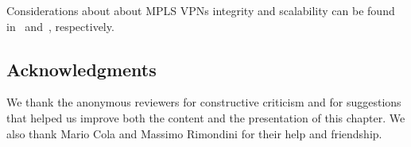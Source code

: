 \documentclass{article}
\begin{document}
Considerations about about MPLS VPNs integrity and scalability can be found in~\cite{integrity} and~\cite{juniper-preso,rfc5439}, respectively.


\subsection*{Acknowledgments}

We thank the anonymous reviewers for constructive criticism and for suggestions 
that helped us improve both the content and the presentation of this chapter. We 
also thank Mario Cola and Massimo Rimondini for their help and 
friendship.


%



\end{document}
